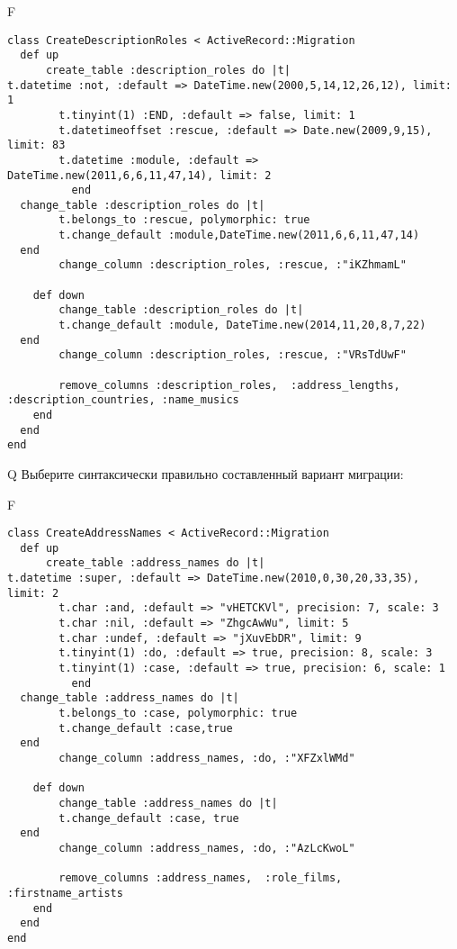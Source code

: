 F
\begin{verbatim}
class CreateDescriptionRoles < ActiveRecord::Migration
  def up
	  create_table :description_roles do |t|
t.datetime :not, :default => DateTime.new(2000,5,14,12,26,12), limit: 1
		t.tinyint(1) :END, :default => false, limit: 1
		t.datetimeoffset :rescue, :default => Date.new(2009,9,15), limit: 83
		t.datetime :module, :default => DateTime.new(2011,6,6,11,47,14), limit: 2
		  end
  change_table :description_roles do |t|
		t.belongs_to :rescue, polymorphic: true
 		t.change_default :module,DateTime.new(2011,6,6,11,47,14)
  end
 		change_column :description_roles, :rescue, :"iKZhmamL"
   
	def down
		change_table :description_roles do |t|
		t.change_default :module, DateTime.new(2014,11,20,8,7,22)
  end
 		change_column :description_roles, :rescue, :"VRsTdUwF"
   
		remove_columns :description_roles,  :address_lengths, :description_countries, :name_musics 
    end 
  end
end

\end{verbatim}

Q
Выберите синтаксически правильно составленный вариант миграции:

F
\begin{verbatim}
class CreateAddressNames < ActiveRecord::Migration
  def up
	  create_table :address_names do |t|
t.datetime :super, :default => DateTime.new(2010,0,30,20,33,35), limit: 2
		t.char :and, :default => "vHETCKVl", precision: 7, scale: 3
		t.char :nil, :default => "ZhgcAwWu", limit: 5
		t.char :undef, :default => "jXuvEbDR", limit: 9
		t.tinyint(1) :do, :default => true, precision: 8, scale: 3
		t.tinyint(1) :case, :default => true, precision: 6, scale: 1
		  end
  change_table :address_names do |t|
		t.belongs_to :case, polymorphic: true
 		t.change_default :case,true
  end
 		change_column :address_names, :do, :"XFZxlWMd"
   
	def down
		change_table :address_names do |t|
		t.change_default :case, true
  end
 		change_column :address_names, :do, :"AzLcKwoL"
   
		remove_columns :address_names,  :role_films, :firstname_artists 
    end 
  end
end

\end{verbatim}

